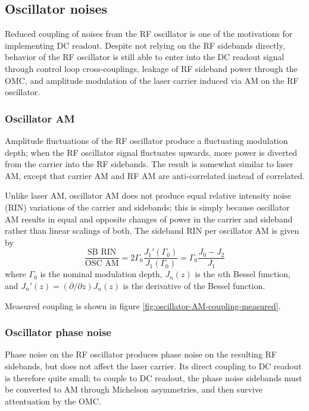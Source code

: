\subsection{Oscillator noises}

Reduced coupling of noises from the RF oscillator is one of the
motivations for implementing DC readout. Despite not relying on the RF
sidebands directly, behavior of the RF oscillator is still able to
enter into the DC readout signal through control loop cross-couplings,
leakage of RF sideband power through the OMC, and amplitude modulation
of the laser carrier induced via AM on the RF oscillator.

\subsubsection{Oscillator AM}

Amplitude fluctuations of the RF oscillator produce a fluctuating modulation
depth; when the RF oscillator signal fluctuates upwards, more power is diverted
from the carrier into the RF sidebands.  The result is somewhat similar to laser
AM, except that carrier AM and RF AM are anti-correlated instead of correlated.

Unlike laser AM, oscillator AM does not produce equal relative intensity noise
(RIN) variations of the carrier and sidebands; this is simply because oscillator
AM results in equal and opposite changes of power in the carrier and sideband
rather than linear scalings of both.  The sideband RIN per oscillator AM is
given by
\begin{equation}
\frac{\text{SB RIN}}{\text{OSC AM}}=2\Gamma_{0}\frac{J_{1}'(\Gamma_{0})}{J_{1}(\Gamma_{0})}=\Gamma_{0}\frac{J_{0}-J_{2}}{J_{1}}
\end{equation}
where $\Gamma_0$ is the nominal modulation depth, $J_n(z)$ is the $n$th Bessel
function, and $J_n'(z)=(\partial/\partial z)J_n(z)$ is the derivative of the Bessel function.

Measured coupling is shown in figure \ref{fig:oscillator-AM-coupling-measured}.

\subsubsection{Oscillator phase noise}

Phase noise on the RF oscillator produces phase noise on the resulting RF
sidebands, but does not affect the laser carrier.  Its direct coupling to DC
readout is therefore quite small; to couple to DC readout, the phase noise
sidebands must be converted to AM through Michelson asymmetries, and then
survive attentuation by the OMC.

